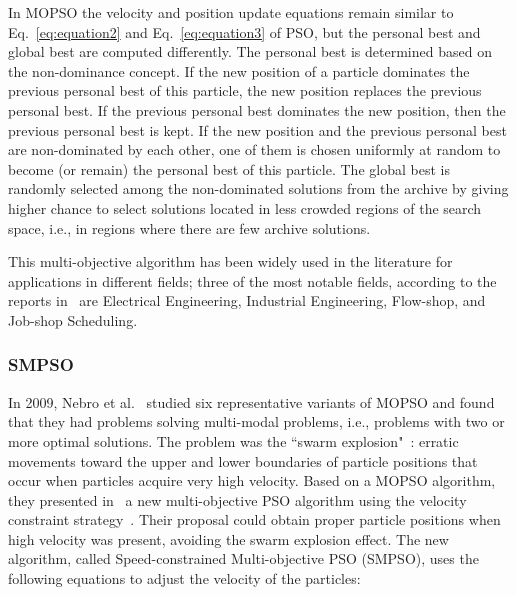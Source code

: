 

In MOPSO the velocity and position update equations remain similar to Eq.~\eqref{eq:equation2} and Eq.~\eqref{eq:equation3} of PSO, but the personal best and global best are computed differently. The personal best is determined based on the non-dominance concept. If the new position of a particle dominates the previous personal best of this particle, the new position replaces the previous personal best. If the previous personal best dominates the new position, then the previous personal best is kept. If the new position and the previous personal best are non-dominated by each other, one of them is chosen uniformly at random to become (or remain) the personal best of this particle. The global best is randomly selected among the non-dominated solutions from the archive by giving higher chance to select solutions located in less crowded regions of the search space, i.e., in regions where there are few archive solutions. 

This multi-objective algorithm has been widely used in the literature for applications in different fields; three of the most notable fields, according to the reports in~\cite{lalwani2013comprehensive} are Electrical Engineering, Industrial Engineering, Flow-shop, and Job-shop Scheduling.

\subsubsection{SMPSO}

In 2009, Nebro et al.~\cite{nebro2009smpso} studied six representative variants of MOPSO and found that they had problems solving multi-modal problems, i.e., problems with two or more optimal solutions. The problem was the ``swarm explosion"~\cite{clerc2002particle}: erratic movements toward the upper and lower boundaries of particle positions that occur when particles acquire very high velocity. Based on a MOPSO algorithm, they presented in~\cite{nebro2009smpso} a new multi-objective PSO algorithm using the velocity constraint strategy~\cite{clerc2002particle}. Their proposal could obtain proper particle positions when high velocity was present, avoiding the swarm explosion effect. The new algorithm, called Speed-constrained Multi-objective PSO (SMPSO), uses the following equations to adjust the velocity of the particles:

